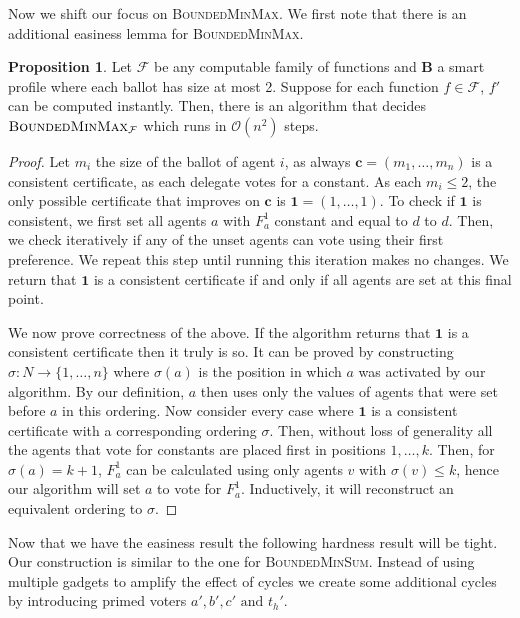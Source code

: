 \documentclass[11pt,a4paper, titlepage]{article}
\theoremstyle{definition}
\newtheorem{proposition}[theorem]{Proposition}
\let\vec\mathbf
\newcommand{\BMM}{\textsc{BoundedMinMax}}
\newcommand{\BMS}{\textsc{BoundedMinSum}}
\begin{document}
Now we shift our focus on \textsc{BoundedMinMax}.
We first note that there is an additional easiness lemma for \BMM.

\begin{proposition}
    Let $\mathcal{F}$ be any computable family of functions and $\vec{B}$ a smart profile where each ballot has size at most 2.
    Suppose for each function $f \in \mathcal{F}$, $f'$ can be computed instantly.
    Then, there is an algorithm that decides $\BMM_\mathcal{F}$ which runs in $\mathcal{O}(n^2)$ steps. 
\end{proposition}

\begin{proof}
    Let $m_i$ the size of the ballot of agent $i$, as always $\vec{c} = (m_1, \ldots, m_n)$ is a consistent certificate, as each delegate votes for a constant.
    As each $m_i \leq 2$, the only possible certificate that improves on $\vec{c}$ is $\vec{1} = (1, \ldots, 1)$.
    To check if $\vec{1}$ is consistent, we first set all agents $a$ with $F_a^1$ constant and equal to $d$ to $d$.
    Then, we check iteratively if any of the unset agents can vote using their first preference.
    We repeat this step until running this iteration makes no changes.
    We return that $\vec{1}$ is a consistent certificate if and only if all agents are set at this final point.

    We now prove correctness of the above.
    If the algorithm returns that $\vec{1}$ is a consistent certificate then it truly is so. 
    It can be proved by constructing $\sigma \colon N \longrightarrow \{1,\ldots, n\}$ where $\sigma(a)$ is the position in which $a$ was activated by our algorithm.
    By our definition, $a$ then uses only the values of agents that were set before $a$ in this ordering.
    Now consider every case where $\vec{1}$ is a consistent certificate with a corresponding ordering $\sigma$.
    Then, without loss of generality all the agents that vote for constants are placed first in positions $1, \ldots, k$.
    Then, for $\sigma(a) = k+1$, $F_a^{1}$ can be calculated using only agents $v$ with $\sigma(v) \leq k$, hence our algorithm will set $a$ to vote for $F_a^1$. Inductively, it will reconstruct an equivalent ordering to $\sigma$.

\end{proof}

Now that we have the easiness result the following hardness result will be tight.
Our construction is similar to the one for \BMS.
Instead of using multiple gadgets to amplify the effect of cycles we create some additional cycles by introducing primed voters $a', b', c' \text{ and } t_h'$.
\end{document}
